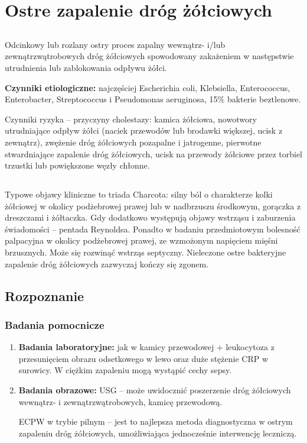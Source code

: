 
\chapter{Ostre zapalenie dróg żółciowych}

\section{\DiEtp}

Odcinkowy lub rozlany ostry proces zapalny wewnątrz- i/lub zewnątrzwątrobowych dróg żółciowych spowodowany zakażeniem w następstwie utrudnienia lub zablokowania odpływu żółci. 

\textbf{Czynniki etiologiczne:} najczęściej Escherichia coli, Klebsiella, Enterococcus, Enterobacter, Streptococcus i Pseudomonas aeruginosa, 15\% bakterie beztlenowe. 

Czynniki ryzyka – przyczyny cholestazy: kamica żółciowa, nowotwory utrudniające odpływ żółci (naciek przewodów lub brodawki większej, ucisk z zewnątrz), zwężenie dróg żółciowych pozapalne i jatrogenne, pierwotne stwardniające zapalenie dróg żółciowych, ucisk na przewody żółciowe przez torbiel trzustki lub powiększone węzły chłonne.

\section{\ObriP}

Typowe objawy kliniczne to triada Charcota: silny ból o charakterze kolki żółciowej w okolicy podżebrowej prawej lub w nadbrzuszu środkowym, gorączka z dreszczami i żółtaczka. 
Gdy dodatkowo występują objawy wstrząsu i zaburzenia świadomości – pentada Reynoldsa. 
Ponadto w badaniu przedmiotowym bolesność palpacyjna w okolicy podżebrowej prawej, ze wzmożonym napięciem mięśni brzusznych. 
Może się rozwinąć wstrząs septyczny. 
Nieleczone ostre bakteryjne zapalenie dróg żółciowych zazwyczaj kończy się zgonem.

\section{Rozpoznanie}

\subsection{Badania pomocnicze}

\begin{enumerate}
    \item \textbf{Badania laboratoryjne:} jak w kamicy przewodowej + leukocytoza z przesunięciem obrazu odsetkowego w lewo oraz duże stężenie CRP w surowicy. 
    W ciężkim zapaleniu mogą wystąpić cechy sepsy.

    \item \textbf{Badania obrazowe:} USG – może uwidocznić poszerzenie dróg żółciowych wewnątrz- i zewnątrzwątrobowych, kamicę przewodową. 
    
    ECPW w trybie pilnym – jest to najlepsza metoda diagnostyczna w ostrym zapaleniu dróg żółciowych, umożliwiająca jednocześnie interwencję leczniczą.
\end{enumerate}

